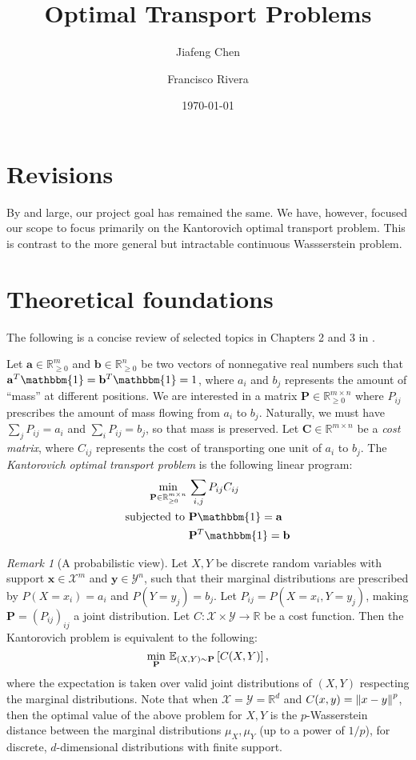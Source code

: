 \documentclass[11pt,reqno]{amsart}
\title{Optimal Transport Problems}
\author{Jiafeng Chen\and Francisco Rivera}
\date{\today}
\newcommand{\R}{\mathbb{R}}
\newcommand{\one}{\mathbbm{1}}
\newcommand{\E}{\mathbb{E}}
\renewcommand{\b}{\mathbf}
\theoremstyle{definition}
\theoremstyle{remark}
\newtheorem{rmk}{Remark}
\begin{document}
\maketitle

\section{Revisions}

By and large, our project goal has remained the same. We have, however,
focused our scope to focus primarily on the Kantorovich optimal transport
problem. This is contrast to the more general but intractable continuous
Wassserstein problem.

\section{Theoretical foundations}
The following is a concise review of selected topics in Chapters 2 and 3 in 
\cite{peyre2017computational}.

Let $\b a \in \R^m_{\ge 0}$ and $\b b \in \R^n_{\ge 0}$ be two vectors of
nonnegative real numbers such that $\b a^T \one = \b b^T \one = 1$, where
$a_i$ and $b_j$ represents the amount of ``mass'' at different positions. 
We are
interested in a matrix $\b P \in \R^{m \times n}_{\ge 0}$ where $P_{ij}$
prescribes
the amount of mass flowing from $a_i$ to $b_j$. Naturally, we must have
$\sum_j P_{ij} = a_i$ and $\sum_i P_{ij} = b_j$, so that mass is preserved.
Let $\b C
\in \R^{m\times n}$ be a \emph{cost matrix}, where $C_{ij}$ represents the
cost of transporting one unit of $a_i$ to $b_j$. The \emph{Kantorovich
optimal transport problem} is the following linear program: \begin{align*}
\min_{\b P \in  \R^{m \times n}_{\ge 0}} \, & \sum_{i,j} P_{ij} C_{ij} \\
\text{subjected to } & \b P \one = \b a \\
& \b P^T \one = \b b
\end{align*}

\begin{rmk}[A probabilistic view]
Let $X,Y$ be discrete random variables with support $\b
x \in \mathcal X^m$ and $\b y \in \mathcal Y^n$, such that their marginal
distributions are
prescribed by $P(X = x_i) = a_i$ and $P(Y =
y_j) = b_j$. Let $P_{ij} = P(X = x_i, Y = y_j)$, making $\b P = (P_{ij})_
{ij}$ a joint
distribution. Let $C: \mathcal X \times \mathcal Y \to \R$ be a cost
function. Then the
Kantorovich problem is equivalent to the following:\[
\min_{\b P}\, \E_{(X,Y) \sim \b P}\bk{C(X,Y)},
\]
where the expectation is taken over valid joint distributions of $(X,Y)$
respecting the marginal distributions. Note that when $\mathcal X = \mathcal
Y = \R^d$ and $C(x,y) = \left\lVert x-y\right\rVert^p$, then the optimal value of the above
problem for $X,Y$ is the $p$-Wasserstein distance between the marginal
distributions $\mu_X,\mu_Y$ (up to a power of $1/p$), for discrete,
$d$-dimensional distributions with finite support.
\end{rmk}
\end{document}
